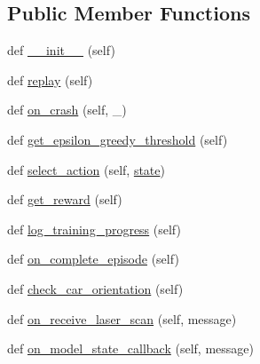 \subsection*{Public Member Functions}
\begin{DoxyCompactItemize}
\item 
def \hyperlink{classtrain_1_1_q_learning_training_node_a29b8eee27131f26d94387231e3970021}{\+\_\+\+\_\+init\+\_\+\+\_\+} (self)
\item 
def \hyperlink{classtrain_1_1_q_learning_training_node_a82007327cc0867fb55d159d2ed3568b6}{replay} (self)
\item 
def \hyperlink{classtrain_1_1_q_learning_training_node_a9f5b2be91deca2b12d3dd055ce294449}{on\+\_\+crash} (self, \+\_\+)
\item 
def \hyperlink{classtrain_1_1_q_learning_training_node_ab4d0383d228012c56c9dd31886b80df6}{get\+\_\+epsilon\+\_\+greedy\+\_\+threshold} (self)
\item 
def \hyperlink{classtrain_1_1_q_learning_training_node_ac03f4ced7d65ef3c2cf36978796fcfda}{select\+\_\+action} (self, \hyperlink{classtrain_1_1_q_learning_training_node_a6e860eb510dc030f536d26c2a3fcc33c}{state})
\item 
def \hyperlink{classtrain_1_1_q_learning_training_node_a1fea335e8f7d2eb257e97364bab331a7}{get\+\_\+reward} (self)
\item 
def \hyperlink{classtrain_1_1_q_learning_training_node_a7263bf517e3d306b383f5d30bf02e8c8}{log\+\_\+training\+\_\+progress} (self)
\item 
def \hyperlink{classtrain_1_1_q_learning_training_node_a659667f05d48676284265ee0e445e96e}{on\+\_\+complete\+\_\+episode} (self)
\item 
def \hyperlink{classtrain_1_1_q_learning_training_node_aeff9ce73821ded751c709f5f5acabd22}{check\+\_\+car\+\_\+orientation} (self)
\item 
def \hyperlink{classtrain_1_1_q_learning_training_node_a4cb5d38537fbb9171e46c85b60efc700}{on\+\_\+receive\+\_\+laser\+\_\+scan} (self, message)
\item 
def \hyperlink{classtrain_1_1_q_learning_training_node_a167547fdc06e2d452d972024fd632b9c}{on\+\_\+model\+\_\+state\+\_\+callback} (self, message)
\end{DoxyCompactItemize}
